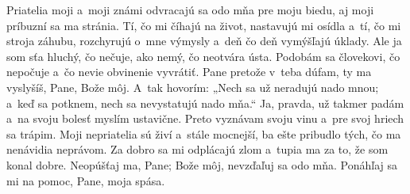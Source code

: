 Priatelia moji a~moji známi
odvracajú sa odo mňa pre moju biedu,
\versseparator
aj moji príbuzní sa ma stránia.
Tí, čo mi číhajú na život, nastavujú mi osídla
\versseparator
a~tí, čo mi stroja záhubu, rozchyrujú o~mne výmysly
a~deň čo deň vymýšľajú úklady.
\versseparator
Ale ja som sťa hluchý, čo nečuje,
ako nemý, čo neotvára ústa.
\versseparator
Podobám sa človekovi, čo nepočuje
a~čo nevie obvinenie vyvrátiť.
\versseparator
Pane pretože v~teba dúfam,
ty ma vyslyšíš, Pane, Bože môj.
\versseparator
A~tak hovorím: „Nech sa už neradujú nado mnou;
a~keď sa potknem,
nech sa nevystatujú nado mňa.“
\versseparator
Ja, pravda, už takmer padám
a~na svoju bolesť myslím ustavične.
\versseparator
Preto vyznávam svoju vinu
a~pre svoj hriech sa trápim.
\versseparator
Moji nepriatelia sú živí a~stále mocnejší,
ba ešte pribudlo tých, čo ma nenávidia neprávom.
\versseparator
Za dobro sa mi odplácajú zlom a~tupia ma za to,
že som konal dobre.
\versseparator
Neopúšťaj ma, Pane;
Bože môj, nevzďaľuj sa odo mňa.
\versseparator
Ponáhľaj sa mi na pomoc,
Pane, moja spása. 